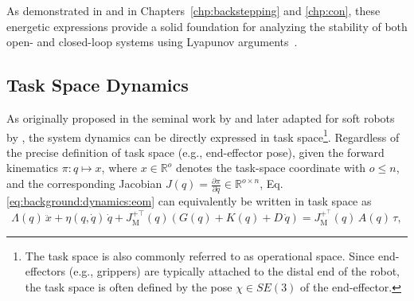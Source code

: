 As demonstrated in \citet{della2020model, della2023model} and in Chapters~\ref{chp:backstepping} and \ref{chp:con}, these energetic expressions provide a solid foundation for analyzing the stability of both open- and closed-loop systems using Lyapunov arguments~\citep{khalil2002nonlinear}.

\subsection{Task Space Dynamics}\label{sub:background:dynamics:task_space}
As originally proposed in the seminal work by \citet{khatib1987unified} and later adapted for soft robots by \citet{della2020model}, the system dynamics can be directly expressed in task space\footnote{The task space is also commonly referred to as operational space. Since end-effectors (e.g., grippers) are typically attached to the distal end of the robot, the task space is often defined by the pose $\chi \in SE(3)$ of the end-effector.}. Regardless of the precise definition of task space (e.g., end-effector pose), given the forward kinematics $\pi: q \mapsto x$, where $x \in \mathbb{R}^o$ denotes the task-space coordinate with $o \leq n$, and the corresponding Jacobian $J(q) = \frac{\partial \pi}{\partial q} \in \mathbb{R}^{o \times n}$, Eq.\ref{eq:background:dynamics:eom} can equivalently be written in task space as
\begin{equation}\label{eq:background:dynamics:eom_task_space}
    \Lambda(q) \, \ddot{x} + \eta(q, \dot{q}) \, \dot{q} + J_\mathrm{M}^{+\top}(q) \left ( G(q) + K(q) + D \, \dot{q} \right ) = J_\mathrm{M}^{+^\top}(q) \, A(q) \, \tau,
\end{equation}
